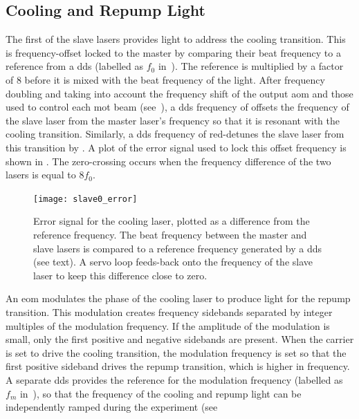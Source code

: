 \subsection{Cooling and Repump Light}
The first of the slave lasers provides light to address the cooling
transition. This is
frequency-offset locked to the master by comparing their beat frequency to a
reference from a \ac{dds} (labelled as $f_0$
in~). The reference is multiplied by a factor
of 8 before it is mixed with the beat frequency of the
 light. After frequency doubling and taking into account the frequency shift of
the output \ac{aom} and those used to control each \ac{mot} beam
(see~), a \ac{dds} frequency of
 offsets the frequency of the slave laser from
the master laser's frequency so that it is resonant with the
 cooling transition. Similarly, a \ac{dds} frequency of
 red-detunes the slave laser from this transition
by . A plot of the error signal used to lock this offset
frequency is shown in . The zero-crossing
occurs when the frequency difference of the two lasers is equal to
$8 f_0$. 
\begin{figure}[!htbp]
	\centering
	\texttt{[image: slave0\_error]}
	\caption[Error Signal for the \Muquans\ Cooling laser.]{Error signal
  for the \Muquans cooling laser, plotted as a difference from the
reference frequency. The beat frequency between the master and slave
lasers is compared to a reference frequency generated by a \ac{dds}
(see text). A servo loop feeds-back onto the frequency of the slave laser to keep this difference close to zero.}\label{fig:slave_offset}
\end{figure}
\par\noindent 
An \ac{eom} modulates the phase of the cooling laser to
produce light for the  repump transition. This modulation
creates frequency sidebands separated by integer multiples of the
modulation frequency. If the amplitude of the modulation is small, only the first
positive and negative sidebands are present. When the carrier is set
to drive the cooling transition, the modulation frequency is set so that the first
positive sideband drives the repump transition, which is
 higher in frequency. A separate \ac{dds} provides
the reference for the modulation frequency (labelled as $f_m$
in~), so that the frequency of
the cooling and repump
light can be independently ramped during the experiment (see
